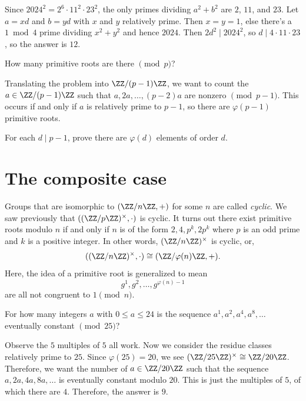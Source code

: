 \documentclass[11pt]{scrartcl}
\begin{document}
Since $2024^2 = 2^6 \cdot 11^2 \cdot 23^2$, the only primes dividing $a^2 + b^2$ are $2$, $11$, and $23$. Let $a = xd$ and $b = yd$ with $x$ and $y$ relatively prime. Then $x = y = 1$, else there's a $1 \bmod 4$ prime dividing $x^2 + y^2$ and hence $2024$. Then $2d^2 \mid 2024^2$, so $d \mid 4 \cdot 11 \cdot 23$, so the answer is $12$.

\begin{example}
	How many primitive roots are there $\pmod{p}$?
\end{example}

Translating the problem into $\ZZ/(p - 1)\ZZ$, we want to count the $a \in \ZZ/(p - 1)\ZZ$ such that $a,2a,\dots,(p - 2)a$ are nonzero $\pmod{p - 1}$. This occurs if and only if $a$ is relatively prime to $p - 1$, so there are $\varphi(p - 1)$ primitive roots.

\begin{exercise}\label{ex:num_order}
	For each $d \mid p - 1$, prove there are $\varphi(d)$ elements of order $d$.
\end{exercise}

\section{The composite case}

Groups that are isomorphic to $(\ZZ/n\ZZ,+)$ for some $n$ are called \emph{cyclic}. We saw previously that $((\ZZ/p\ZZ)^\times,\cdot)$ is cyclic. It turns out there exist primitive roots modulo $n$ if and only if $n$ is of the form $2,4,p^k,2p^k$ where $p$ is an odd prime and $k$ is a positive integer. In other words, $(\ZZ/n\ZZ)^\times$ is cyclic, or,
\[((\ZZ/n\ZZ)^\times,\cdot) \cong (\ZZ/\varphi(n)\ZZ,+).\]
Here, the idea of a primitive root is generalized to mean
\[g^1,g^2,\dots,g^{\varphi(n) - 1}\]
are all not congruent to $1 \pmod{n}$.

\begin{example}\label{ex:weak_hmmt}
	For how many integers $a$ with $0 \le a \le 24$ is the sequence $a^1,a^2,a^4,a^8,\dots$ eventually constant $\pmod{25}$?
\end{example}

Observe the $5$ multiples of $5$ all work. Now we consider the residue classes relatively prime to $25$. Since $\varphi(25) = 20$, we see $(\ZZ/25\ZZ)^\times \cong \ZZ/20\ZZ$. Therefore, we want the number of $a \in \ZZ/20\ZZ$ such that the sequence $a,2a,4a,8a,\dots$ is eventually constant modulo $20$. This is just the multiples of $5$, of which there are $4$. Therefore, the answer is $9$.
\end{document}
